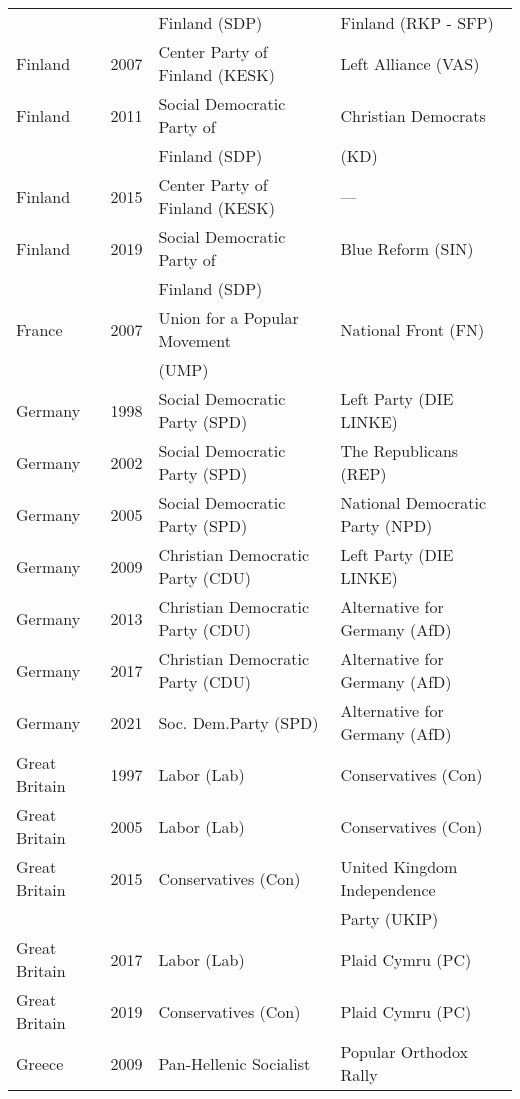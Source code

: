 {\begin{longtable}{|l|c|l|l|}
           &   &          Finland (SDP) &   Finland (RKP - SFP) \\ 
  Finland & 2007 &   Center Party of Finland (KESK) &   Left Alliance (VAS) \\ 
  Finland & 2011 &        Social  Democratic Party of   &   Christian Democrats   \\ 
         &       &         Finland (SDP) &     (KD) \\ 
  Finland & 2015 &   Center Party of Finland (KESK) & --- \\ 
  Finland & 2019 &        Social Democratic Party of   &   Blue Reform (SIN)   \\ 
           &    &          Finland (SDP) &      \\ 
  France & 2007 &   Union for a Popular Movement     &   National Front (FN) \\ 
         &      &     (UMP)   &     \\ 
  Germany & 1998 &        Social Democratic Party (SPD) &   Left Party (DIE LINKE)   \\ 
  Germany & 2002 &        Social Democratic Party (SPD) &   The Republicans (REP) \\ 
  Germany & 2005 &        Social Democratic Party (SPD) &   National Democratic Party (NPD)   \\ 
Germany & 2009 &   Christian Democratic Party (CDU) &   Left Party (DIE LINKE)   \\ 
  Germany & 2013 &   Christian Democratic Party (CDU) &   Alternative for Germany (AfD) \\ 
  Germany & 2017 &   Christian Democratic Party (CDU) &   Alternative for Germany (AfD) \\ 
  Germany & 2021 &        Soc. Dem.Party (SPD) &   Alternative for Germany (AfD) \\ 
  Great Britain & 1997 &   Labor (Lab) &   Conservatives (Con) \\ 
  Great Britain & 2005 &   Labor (Lab) &   Conservatives (Con) \\ 
  Great Britain & 2015 &   Conservatives (Con) &   United Kingdom Independence  \\ 
    &   &     &    Party (UKIP) \\ 
  Great Britain & 2017 &   Labor (Lab) &   Plaid Cymru (PC)   \\ 
  Great Britain & 2019 &   Conservatives (Con) &   Plaid Cymru (PC)   \\ 
  Greece & 2009 & Pan-Hellenic Socialist   &  Popular Orthodox Rally  \\ 

\end{longtable}}
